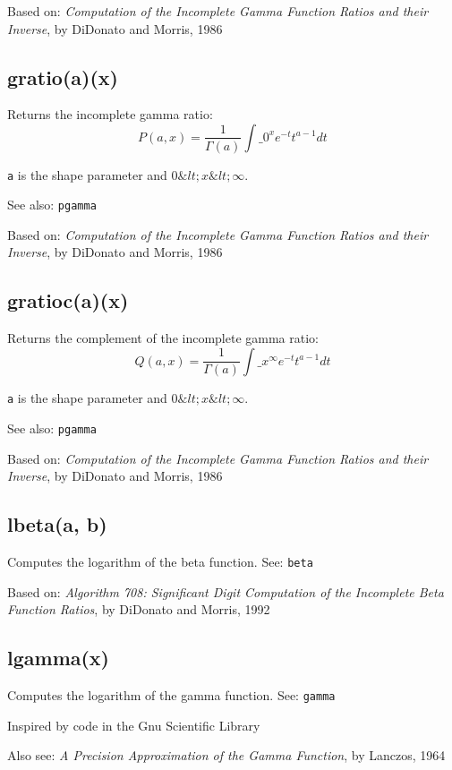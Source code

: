 \documentclass{article}
\begin{document}
Based on:   \emph{Computation of the Incomplete Gamma Function Ratios
and their Inverse}, by DiDonato and Morris, 1986


    \subsection*{gratio(a)(x)}
    Returns the incomplete gamma ratio:
$$P(a,x) = \frac{1}{\Gamma(a)} \int\_0^x e^{-t} t^{a-1} dt$$


\texttt{a} is the shape parameter and $0 \&lt; x \&lt; \infty$.


See also: \texttt{pgamma}


Based on:  \emph{Computation of the Incomplete Gamma Function Ratios
and their Inverse}, by DiDonato and Morris, 1986


    \subsection*{gratioc(a)(x)}
    Returns the complement of the incomplete gamma ratio:
$$Q(a,x) = \frac{1}{\Gamma(a)} \int\_x^\infty e^{-t} t^{a-1} dt$$


\texttt{a} is the shape parameter and $0 \&lt; x \&lt; \infty$.


See also: \texttt{pgamma}


Based on:  \emph{Computation of the Incomplete Gamma Function Ratios
and their Inverse}, by DiDonato and Morris, 1986


    \subsection*{lbeta(a, b)}
    Computes the logarithm of the beta function.
See: \texttt{beta}


Based on: \emph{Algorithm 708: Significant Digit Computation of the Incomplete Beta Function
Ratios}, by DiDonato and Morris, 1992


    \subsection*{lgamma(x)}
    Computes the logarithm of the gamma function.  See: \texttt{gamma}


Inspired by code in the Gnu Scientific Library


Also see: \emph{A Precision Approximation of the Gamma Function}, by
Lanczos, 1964
\end{document}
